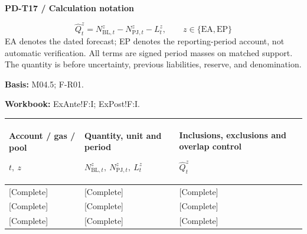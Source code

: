 \par\begingroup\sffamily\fontsize{8}{10}\selectfont\color{NEBGreen}\setlength{\parskip}{2pt}\setlength{\abovedisplayskip}{4pt}\setlength{\belowdisplayskip}{4pt}\setlength{\abovedisplayshortskip}{2pt}\setlength{\belowdisplayshortskip}{3pt}
\textbf{PD-T17 / Calculation notation}\par
{\fontsize{9}{11}\selectfont\[ \widehat Q_t^z=N_{\mathrm{BL},t}^z-N_{\mathrm{PJ},t}^z-L_t^z,\qquad z\in\{\mathrm{EA},\mathrm{EP}\} \]}
EA denotes the dated forecast; EP denotes the reporting-period account, not automatic verification. All terms are signed period masses on matched support. The quantity is before uncertainty, previous liabilities, reserve, and denomination.\par
\textbf{Basis:} M04.5; F-R01.\par
\textbf{Workbook:} ExAnte!F:I; ExPost!F:I.\par\endgroup
{\sffamily\fontsize{8.3}{10.3}\selectfont\begin{longtable}{@{}P{51.14mm} P{47.84mm} P{65.99mm}@{}}
\toprule
\textbf{Account / gas / pool}\par {\normalfont\fontsize{8.2}{10}\selectfont $t,\ z$} & \textbf{Quantity, unit and period}\par {\normalfont\fontsize{8.2}{10}\selectfont $N_{\mathrm{BL},t}^z,\ N_{\mathrm{PJ},t}^z,\ L_t^z$} & \textbf{Inclusions, exclusions and overlap control}\par {\normalfont\fontsize{8.2}{10}\selectfont $\widehat Q_t^z$}\\\midrule\endhead
\rule{0pt}{7.7mm}[Complete] & [Complete] & [Complete]\\\hline
\rule{0pt}{7.7mm}[Complete] & [Complete] & [Complete]\\\hline
\rule{0pt}{7.7mm}[Complete] & [Complete] & [Complete]\\\hline
\end{longtable}}
\par\begingroup\sffamily\fontsize{8}{10}\selectfont\color{NEBGreen}\setlength{\parskip}{2pt}\setlength{\abovedisplayskip}{4pt}\setlength{\belowdisplayskip}{4pt}\setlength{\abovedisplayshortskip}{2pt}\setlength{\belowdisplayshortskip}{3pt}
